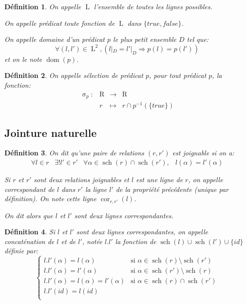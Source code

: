 \documentclass[french]{article}
\DeclareMathOperator{\sel}{\sigma}
\DeclareMathOperator{\dom}{dom}
\DeclareMathOperator{\R}{R}
\DeclareMathOperator{\s}{sch}
\DeclareMathOperator{\ls}{L}
\DeclareMathOperator{\cor}{cor}
\newcommand{\selP}{\sel_p}
\newtheorem{defi}{Définition}
\begin{document}
\begin{defi}
	On appelle $\ls$ l'ensemble de toutes les lignes possibles.
	
	On appelle \emph{prédicat} toute fonction
	de $\ls$ dans $\{true, false\}$.
	
	On appelle \emph{domaine} d'un prédicat $p$ le plus petit
	ensemble $D$ tel que:
	$$
	\forall (l, l') \in \ls^2, (l|_D = l'|_D \Rightarrow  p(l) = p(l')) 
	$$
	et on le note $\dom(p)$.
\end{defi}

\begin{defi}
	On appelle \emph{sélection de prédicat $p$}, pour tout prédicat $p$, la fonction:
	$$
	\begin{array}{llcl}
	\selP: 	& \R 	& \rightarrow 	& \R \\
			& r		& \mapsto		& r \cap p^{-1}(\{true\})
	\end{array}
	$$
\end{defi}

\subsection*{Jointure naturelle}
\begin{defi}
	On dit qu'\emph{une paire de relations} $(r,r')$ 
	est \emph{joignable} si on a:
	$$
	\begin{array}{lllr}
	\forall l \in r &
	\exists! l' \in r' &
	\forall \alpha \in \s(r) \cap \s(r'), &
	l(\alpha) = l'(\alpha)
	\end{array}
	$$
	
	Si $r$ et $r'$ sont deux relations joignables
	et $l$ est une ligne de $r$,
	on appelle \emph{correspondant de $l$ dans
	$r'$} la ligne $l'$ de la propriété précédente
	(unique par définition).
	On note cette ligne $\cor_{r, r'}(l)$.
	
	On dit alors que $l$ et $l'$ sont
	\emph{deux lignes correspondantes}.
\end{defi}

\begin{defi}
	Si $l$ et $l'$ sont deux lignes correspondantes,
	on appelle \emph{concaténation de $l$ et de $l'$},
	notée $l.l'$ la fonction de $\s(l) \cup \s(l') \cup \{id\}$
	définie par:
	$$
	\left\lbrace
	\begin{array}{ll}
	l.l'(\alpha)  = l(\alpha) & \text{si $\alpha \in \s(r) \setminus \s(r')$} \\
	l.l'(\alpha)  = l'(\alpha) & \text{si $\alpha \in \s(r') \setminus \s(r)$} \\
	l.l'(\alpha)  = l(\alpha) = l'(\alpha) & \text{si $\alpha \in \s(r) \cap \s(r')$} \\
	l.l'(id)  = l(id) &  \\
	\end{array}
	\right.
	$$
\end{defi}
\end{document}
